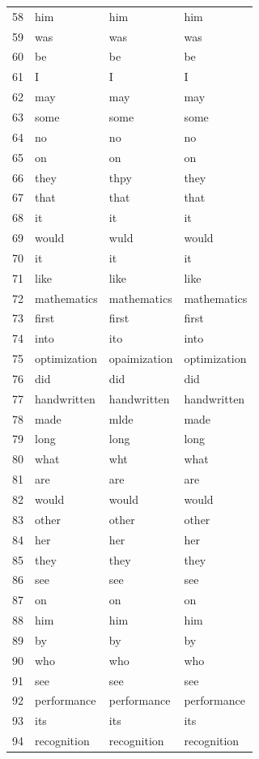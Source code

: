 \begin{longtable}{clll}
    58 & him & him & him \\
    59 & was & was & was \\
    60 & be & be & be \\
    61 & I & I & I \\
    62 & may & may & may \\
    63 & some & some & some \\
    64 & no & no & no \\
    65 & on & on & on \\
    66 & they & thpy & they \\
    67 & that & that & that \\
    68 & it & it & it \\
    69 & would & wuld & would \\
    70 & it & it & it \\
    71 & like & like & like \\
    72 & mathematics & mathematics & mathematics \\
    73 & first & first & first \\
    74 & into & ito & into \\
    75 & optimization & opaimization & optimization \\
    76 & did & did & did \\
    77 & handwritten & handwritten & handwritten \\
    78 & made & mlde & made \\
    79 & long & long & long \\
    80 & what & wht & what \\
    81 & are & are & are \\
    82 & would & would & would \\
    83 & other & other & other \\
    84 & her & her & her \\
    85 & they & they & they \\
    86 & see & see & see \\
    87 & on & on & on \\
    88 & him & him & him \\
    89 & by & by & by \\
    90 & who & who & who \\
    91 & see & see & see \\
    92 & performance & performance & performance \\
    93 & its & its & its \\
    94 & recognition & recognition & recognition \\

\end{longtable}
